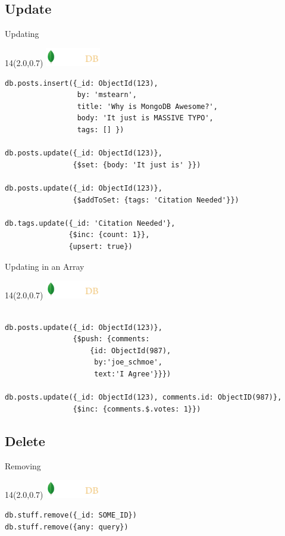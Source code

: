 \documentclass{beamer}
\newcommand{\MongoLogo}{
\begin{textblock}{14}(2.0,0.7)
  \includegraphics[height=0.8cm]{logo-mongodb-ondark.png}
\end{textblock}
}
\begin{document}
\subsection{Update}
\begin{frame}[fragile]{Updating}
  \MongoLogo

  \small
  \begin{lstlisting}
db.posts.insert({_id: ObjectId(123),
                 by: 'mstearn',
                 title: 'Why is MongoDB Awesome?',
                 body: 'It just is MASSIVE TYPO',
                 tags: [] })

db.posts.update({_id: ObjectId(123)},
                {$set: {body: 'It just is' }})

db.posts.update({_id: ObjectId(123)},
                {$addToSet: {tags: 'Citation Needed'}})

db.tags.update({_id: 'Citation Needed'},
               {$inc: {count: 1}},
               {upsert: true})
  \end{lstlisting}
\end{frame}

\begin{frame}[fragile]{Updating in an Array}
  \MongoLogo

  \small
  \begin{lstlisting}

db.posts.update({_id: ObjectId(123)},
                {$push: {comments:
                    {id: ObjectId(987),
                     by:'joe_schmoe',
                     text:'I Agree'}}})

db.posts.update({_id: ObjectId(123), comments.id: ObjectID(987)},
                {$inc: {comments.$.votes: 1}})

  \end{lstlisting}
\end{frame}

\subsection{Delete}
\begin{frame}[fragile]{Removing}
  \MongoLogo

  \begin{lstlisting}
db.stuff.remove({_id: SOME_ID})
db.stuff.remove({any: query})
  \end{lstlisting}
\end{frame}
\end{document}
